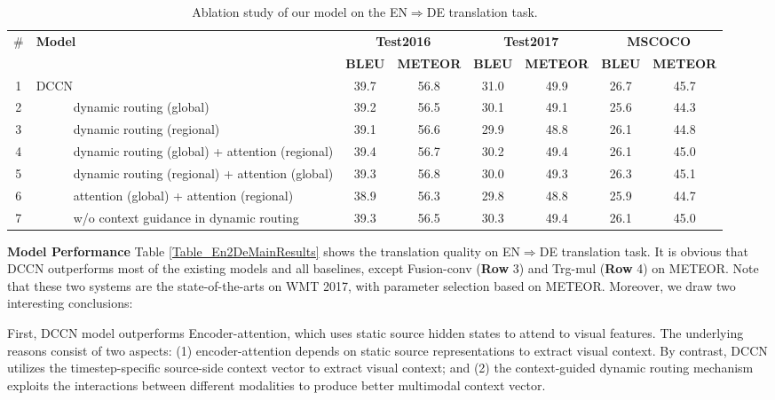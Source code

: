 \documentclass[sigconf]{acmart}
\begin{document}
\begin{table*}
\centering
\footnotesize
\begin{tabular}{c|l|cc|cc|cc}  
\hline
\multirow{2}{*}{\#} &\multirow{2}{*}{\bf Model} & \multicolumn{2}{|c|}{\textbf{Test2016}} & \multicolumn{2}{|c|}{\textbf{Test2017}} & \multicolumn{2}{c}{\textbf{MSCOCO}} \\ 
\cline{3-8}
& & \textbf{BLEU} & \textbf{METEOR} & \textbf{BLEU} & \textbf{METEOR}  & \textbf{BLEU} & \textbf{METEOR}\\
\hline
\hline
1 &DCCN & 39.7 & 56.8  & 31.0 & 49.9  & 26.7 & 45.7 \\
\hline
2 & \ \ \ \ \ \ dynamic routing (global)   & 39.2 & 56.5  & 30.1 & 49.1   & 25.6 & 44.3  \\
3 & \ \ \ \ \ \ dynamic routing (regional) & 39.1 & 56.6  & 29.9 & 48.8   & 26.1 & 44.8  \\
\hline
4 &\ \ \ \ \ \ dynamic routing (global) + attention (regional) & 39.4 & 56.7  & 30.2 & 49.4  & 26.1 & 45.0 \\
5 &\ \ \ \ \ \ dynamic routing (regional) + attention (global) & 39.3 & 56.8  & 30.0 & 49.3  & 26.3 & 45.1 \\
6 &\ \ \ \ \ \ attention (global) + attention (regional)       & 38.9 & 56.3  & 29.8 & 48.8  & 25.9 & 44.7 \\
\hline
7 &\ \ \ \ \ \ w/o context guidance in dynamic routing  & 39.3 & 56.5   & 30.3 & 49.4  & 26.1 & 45.0  \\
\hline
\end{tabular}
\caption{
\label{Table_ablation}
Ablation study of our model on the EN$\Rightarrow$DE translation task. 
\vspace{-10pt}
}
\end{table*}


\textbf{Model Performance} Table \ref{Table_En2DeMainResults} shows the translation quality on  EN$\Rightarrow$DE translation task. It is obvious that DCCN outperforms most of the existing models and all baselines, except Fusion-conv (\textbf{Row} 3) and Trg-mul (\textbf{Row} 4) on METEOR. Note that these two systems are the state-of-the-arts on WMT 2017, with parameter selection based on METEOR. Moreover, we draw two interesting conclusions:

First, DCCN model outperforms Encoder-attention, which uses static source hidden states to attend to visual features. The underlying reasons consist of two aspects: (1) encoder-attention depends on static source representations to extract visual context. By contrast, DCCN utilizes the timestep-specific source-side context vector to extract visual context; and (2) the context-guided dynamic routing mechanism exploits the interactions between different modalities to produce better multimodal context vector. 
\end{document}
